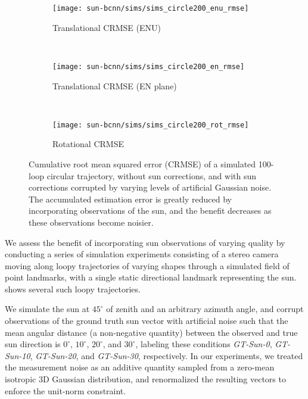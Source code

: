 \begin{figure*}
\centering
	 \begin{subfigure}{0.42\textwidth}
	 	\vspace{-5pt}
    	\texttt{[image: sun-bcnn/sims/sims\_circle200\_enu\_rmse]}
        \caption{Translational CRMSE (ENU)}
        \label{fig:sim_traj}
    \end{subfigure}
    ~
    \begin{subfigure}{0.42\textwidth}
    	\vspace{-5pt}
    	\texttt{[image: sun-bcnn/sims/sims\_circle200\_en\_rmse]}
        \caption{Translational CRMSE (EN plane)}
        \label{fig:sim_en_rmse}
    \end{subfigure}
    ~
    \begin{subfigure}{0.42\textwidth}
    	\texttt{[image: sun-bcnn/sims/sims\_circle200\_rot\_rmse]}
        \caption{Rotational CRMSE}
        \label{fig:sim_rot_rmse}
    \end{subfigure}

\caption{Cumulative root mean squared error (CRMSE) of a simulated 100-loop circular trajectory, without sun corrections, and with sun corrections corrupted by varying levels of artificial Gaussian noise. The accumulated estimation error is greatly reduced by incorporating observations of the sun, and the benefit decreases as these observations become noisier.}
\label{fig:sim_rmse}
\end{figure*}

We assess the benefit of incorporating sun observations of varying quality by conducting a series of simulation experiments consisting of a stereo camera moving along loopy trajectories of varying shapes through a simulated field of point landmarks, with a single static directional landmark representing the sun.
 shows several such loopy trajectories.

We simulate the sun at $45^\circ$ of zenith and an arbitrary azimuth angle, and corrupt observations of the ground truth sun vector with artificial noise such that the mean angular distance (a non-negative quantity) between the observed and true sun direction is $0^\circ$, $10^\circ$, $20^\circ$, and $30^\circ$, labeling these conditions \emph{GT-Sun-0}, \emph{GT-Sun-10}, \emph{GT-Sun-20}, and \emph{GT-Sun-30}, respectively.
In our experiments, we treated the measurement noise as an additive quantity sampled from a zero-mean isotropic 3D Gaussian distribution, and renormalized the resulting vectors to enforce the unit-norm constraint.


